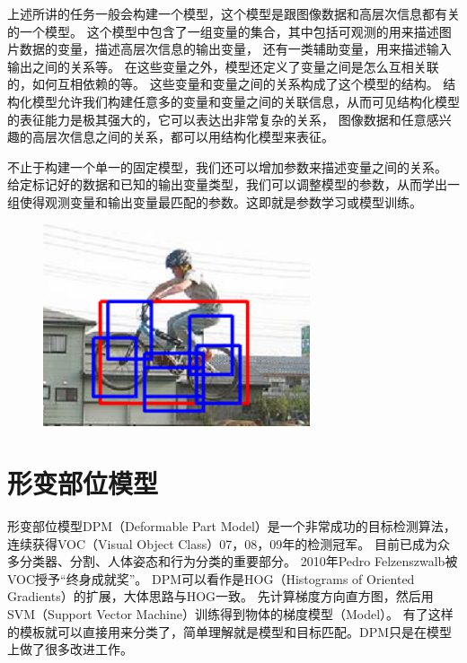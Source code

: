 上述所讲的任务一般会构建一个模型，这个模型是跟图像数据和高层次信息都有关的一个模型。
这个模型中包含了一组变量的集合，其中包括可观测的用来描述图片数据的变量，描述高层次信息的输出变量，
还有一类辅助变量，用来描述输入输出之间的关系等。
在这些变量之外，模型还定义了变量之间是怎么互相关联的，如何互相依赖的等。
这些变量和变量之间的关系构成了这个模型的结构。
结构化模型允许我们构建任意多的变量和变量之间的关联信息，从而可见结构化模型的表征能力是极其强大的，它可以表达出非常复杂的关系，
图像数据和任意感兴趣的高层次信息之间的关系，都可以用结构化模型来表征。

不止于构建一个单一的固定模型，我们还可以增加参数来描述变量之间的关系。
给定标记好的数据和已知的输出变量类型，我们可以调整模型的参数，从而学出一组使得观测变量和输出变量最匹配的参数。这即就是参数学习或模型训练。

\begin{figure}
\centering
\includegraphics[width=0.7\textwidth]{img/dpm1.png}
\label{fig:dpm1}
\end{figure}

\section{形变部位模型}
形变部位模型\cite{llsvm}DPM（Deformable Part Model）是一个非常成功的目标检测算法，
连续获得VOC（Visual Object Class）07，08，09年的检测冠军。
目前已成为众多分类器、分割、人体姿态和行为分类的重要部分。
2010年Pedro Felzenszwalb被VOC授予“终身成就奖”。
DPM可以看作是HOG（Histograms of Oriented Gradients）的扩展，大体思路与HOG一致。
先计算梯度方向直方图，然后用SVM（Support Vector Machine）训练得到物体的梯度模型（Model）。
有了这样的模板就可以直接用来分类了，简单理解就是模型和目标匹配。DPM只是在模型上做了很多改进工作。

